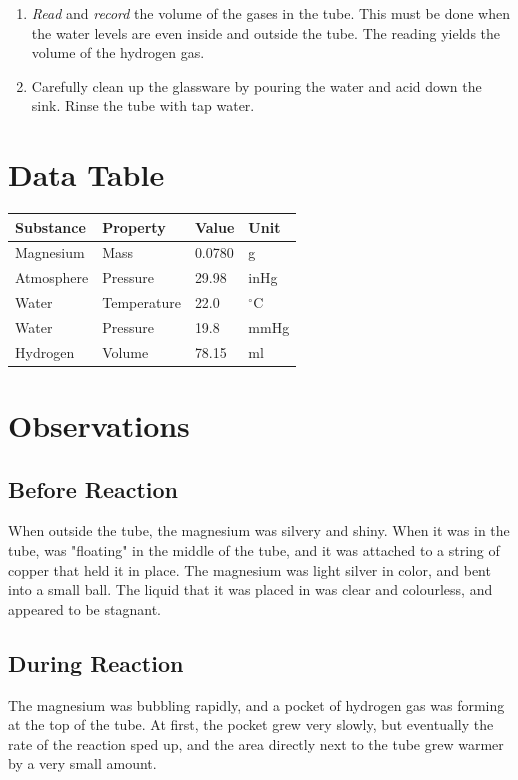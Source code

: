 \documentclass[11pt]{article}
\begin{document}
\begin{enumerate}
	\item \textit{Read} and \textit{record} the volume of the gases in the tube. This must be done when the water levels are even inside and outside the tube. The reading yields the volume of the hydrogen gas. 
	 
	\item Carefully clean up the glassware by pouring the water and acid down the sink. Rinse the tube with tap water.
	
\end{enumerate}

\section{Data Table}
\begin{tabular}{ | l | l | l | l |}
\hline \textbf{\large{Substance}} & \textbf{\large{Property}} & \textbf{\large{Value}} & \textbf{\large{Unit}}\\ \hline
	Magnesium 	& Mass 			& 0.0780  & g\\ \hline
	Atmosphere 	& Pressure 		& 29.98 & inHg \\ \hline
	Water 		& Temperature 	& 22.0 	& $^\circ$C\\ \hline
	Water 		& Pressure 		& 19.8 	& mmHg\\ \hline
	Hydrogen 	& Volume 		& 78.15 & ml\\ \hline
\end{tabular}

\section{Observations}
	\subsection{Before Reaction}
	When outside the tube, the magnesium was silvery and shiny. When it was in the tube, was "floating" in the middle of the tube, and it was attached to a string of copper that held it in place. The magnesium was light silver in color, and bent into a small ball. The liquid that it was placed in was clear and colourless, and appeared to be stagnant.
	\subsection{During Reaction}
	The magnesium was bubbling rapidly, and a pocket of hydrogen gas was forming at the top of the tube. At first, the pocket grew very slowly, but eventually the rate of the reaction sped up, and the area directly next to the tube grew warmer by a very small amount.
\end{document}
